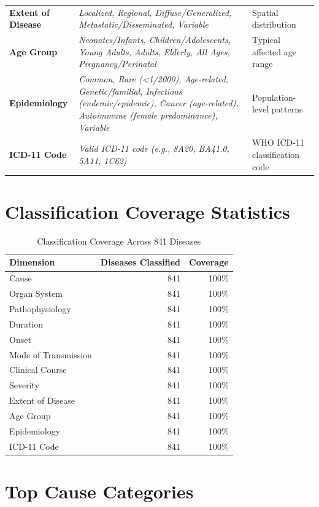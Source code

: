 \begin{table}[htbp]
\begin{tabular}{>{\bfseries}llp{8cm}}
Extent of Disease & \textit{Localized, Regional, Diffuse/Generalized, Metastatic/Disseminated, Variable} & Spatial distribution \\
Age Group & \textit{Neonates/Infants, Children/Adolescents, Young Adults, Adults, Elderly, All Ages, Pregnancy/Perinatal} & Typical affected age range \\
Epidemiology & \textit{Common, Rare (<1/2000), Age-related, Genetic/familial, Infectious (endemic/epidemic), Cancer (age-related), Autoimmune (female predominance), Variable} & Population-level patterns \\
ICD-11 Code & \textit{Valid ICD-11 code (e.g., 8A20, BA41.0, 5A11, 1C62)} & WHO ICD-11 classification code \\
\bottomrule
\end{tabular}
\end{table}

\section{Classification Coverage Statistics}
\label{sec:classification_stats}

\begin{table}[htbp]
\centering
\caption{Classification Coverage Across 841 Diseases}
\label{tab:coverage_stats}
\begin{tabular}{lrr}
\toprule
\textbf{Dimension} & \textbf{Diseases Classified} & \textbf{Coverage} \\
\midrule
Cause & 841 & 100\% \\
Organ System & 841 & 100\% \\
Pathophysiology & 841 & 100\% \\
Duration & 841 & 100\% \\
Onset & 841 & 100\% \\
Mode of Transmission & 841 & 100\% \\
Clinical Course & 841 & 100\% \\
Severity & 841 & 100\% \\
Extent of Disease & 841 & 100\% \\
Age Group & 841 & 100\% \\
Epidemiology & 841 & 100\% \\
ICD-11 Code & 841 & 100\% \\
\bottomrule
\end{tabular}
\end{table}

\section{Top Cause Categories}
\label{sec:cause_distribution}

